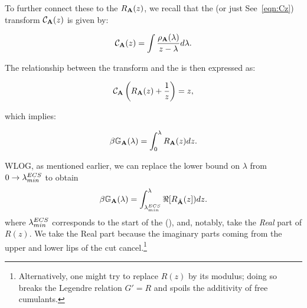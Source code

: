 To further connect these to the \RTransform $R_{\mathbf{A}}(z)$, we recall that the \CauchyStieltjes (or just \Cauchy See~\ref{eqn:Cz}) transform $\mathcal{C}_{\mathbf{A}}(z)$  is given by:

\begin{equation}
\mathcal{C}_{\mathbf{A}}(z) = \int \frac{\rho_{\mathbf{A}}(\lambda)}{z - \lambda} d\lambda.
\end{equation}

The relationship between the \Cauchy transform and the \RTransform is  then expressed as:

\begin{equation}
\mathcal{C}_{\mathbf{A}}\left(R_{\mathbf{A}}(z) + \frac{1}{z}\right) = z,
\end{equation}

which implies:

\begin{equation}
\beta\mathbb{G}_{\mathbf{A}}(\lambda) = \int_0^{\lambda} R_{\mathbf{A}}(z) dz.
\end{equation}

WLOG, as mentioned earlier, we can replace the lower bound on $\lambda$ from
$0\rightarrow\lambda^{ECS}_{min}$ to obtain
\begin{equation}
\beta\mathbb{G}_{\mathbf{A}}(\lambda) = \int_{\lambda^{ECS}_{min}}^{\lambda} \Re[R_{\tilde{\mathbf{A}}}(z]) dz.
\end{equation}
where $\lambda^{ECS}_{min}$ corresponds to the start of the \EffectiveCorrelationSpace (\ECS),
and, notably,  take the \emph{Real} part of $R(z)$.
We take the Real part because the imaginary parts coming from the upper and lower lips of
the cut cancel.\footnote{
Alternatively, one might try to replace $R(z)$ by its modulus;
doing so breaks the Legendre relation $G' = R$ and spoils the
additivity of free cumulants.}

